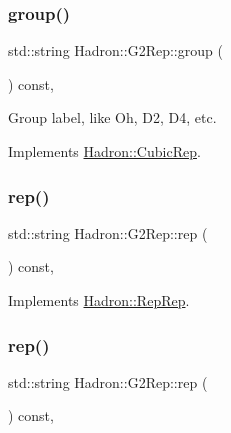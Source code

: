 \subsubsection{\texorpdfstring{group()}{group()}\hspace{0.1cm}{\footnotesize\ttfamily [2/2]}}
{\footnotesize\ttfamily std\+::string Hadron\+::\+G2\+Rep\+::group (\begin{DoxyParamCaption}{ }\end{DoxyParamCaption}) const\hspace{0.3cm}{\ttfamily [inline]}, {\ttfamily [virtual]}}

Group label, like Oh, D2, D4, etc. 

Implements \mbox{\hyperlink{structHadron_1_1CubicRep_a0748f11ec87f387062c8e8981339a29c}{Hadron\+::\+Cubic\+Rep}}.

\mbox{\label{structHadron_1_1G2Rep_aa186588eb9d24c8e3ecad3496a16225a}} 
\subsubsection{\texorpdfstring{rep()}{rep()}\hspace{0.1cm}{\footnotesize\ttfamily [1/3]}}
{\footnotesize\ttfamily std\+::string Hadron\+::\+G2\+Rep\+::rep (\begin{DoxyParamCaption}{ }\end{DoxyParamCaption}) const\hspace{0.3cm}{\ttfamily [inline]}, {\ttfamily [virtual]}}



Implements \mbox{\hyperlink{structHadron_1_1RepRep_ab3213025f6de249f7095892109575fde}{Hadron\+::\+Rep\+Rep}}.

\mbox{\label{structHadron_1_1G2Rep_aa186588eb9d24c8e3ecad3496a16225a}} 
\subsubsection{\texorpdfstring{rep()}{rep()}\hspace{0.1cm}{\footnotesize\ttfamily [2/3]}}
{\footnotesize\ttfamily std\+::string Hadron\+::\+G2\+Rep\+::rep (\begin{DoxyParamCaption}{ }\end{DoxyParamCaption}) const\hspace{0.3cm}{\ttfamily [inline]}, {\ttfamily [virtual]}}



